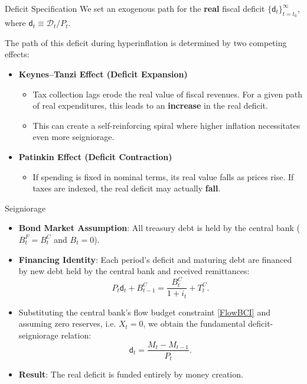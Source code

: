 \documentclass[11pt,aspectratio=169]{beamer}
\begin{document}
\begin{frame}{Deficit Specification}
\small
We set an exogenous path for the \textbf{real} fiscal deficit $\{\mathsf{d}_{t}\}_{t=t_{0}}^{\infty}$, where $\mathsf{d}_{t} \equiv \mathcal{D}_{t}/P_{t}$. 
\vspace{0.3em}

The path of this deficit during hyperinflation is determined by two competing effects:

\begin{itemize}
    \item \textbf{Keynes--Tanzi Effect (Deficit Expansion)}
    \begin{itemize}
        \item Tax collection lags erode the real value of fiscal revenues. For a given path of real expenditures, this leads to an \textbf{increase} in the real deficit.
        \item This can create a self-reinforcing spiral where higher inflation necessitates even more seigniorage.
    \end{itemize}
    
    \vspace{0.2cm}
    \item \textbf{Patinkin Effect (Deficit Contraction)}
    \begin{itemize}
        \item If spending is fixed in nominal terms, its real value falls as prices rise. If taxes are indexed, the real deficit may actually \textbf{fall}.
    \end{itemize}
\end{itemize}
\end{frame}


\begin{frame}{Seigniorage}
\small
\begin{itemize}
    \item \textbf{Bond Market Assumption}: All treasury debt is held by the central bank ($B_{t}^{F}=B_{t}^{C}$ and $B_{t}=0$).
    \item \textbf{Financing Identity}: Each period’s deficit and maturing debt are financed by new debt held by the central bank and received remittances:
    \begin{equation*}
    P_{t}\mathsf{d}_{t}+B_{t-1}^{C}=\frac{B_{t}^{C}}{1+i_{t}}+T_{t}^{C}.
    \end{equation*}
    \item Substituting the central bank's flow budget constraint \eqref{FlowBCI} and assuming zero reserves, i.e. $X_{t}=0$, we obtain the fundamental deficit-seigniorage relation:
    \begin{equation}
    \mathsf{d}_{t}=\frac{M_{t}-M_{t-1}}{P_{t}}. \label{Deficit}
    \end{equation}
    \item \textbf{Result}: The real deficit is funded entirely by money creation.
\end{itemize}
\end{frame}
\end{document}
